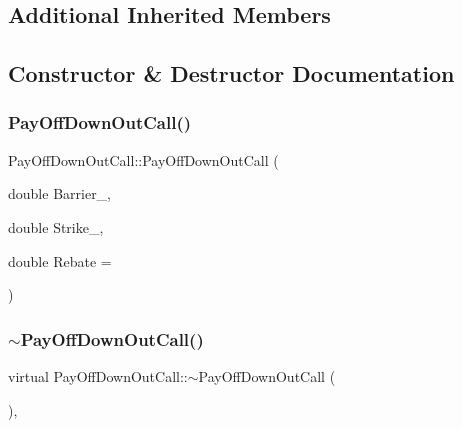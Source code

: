 \subsection*{Additional Inherited Members}


\subsection{Constructor \& Destructor Documentation}
\hypertarget{classPayOffDownOutCall_a2fd200f24f2c56766f5193f3c10a0d61}{}\label{classPayOffDownOutCall_a2fd200f24f2c56766f5193f3c10a0d61} 
\subsubsection{\texorpdfstring{Pay\+Off\+Down\+Out\+Call()}{PayOffDownOutCall()}}
{\footnotesize\ttfamily Pay\+Off\+Down\+Out\+Call\+::\+Pay\+Off\+Down\+Out\+Call (\begin{DoxyParamCaption}\item[{double}]{Barrier\+\_\+,  }\item[{double}]{Strike\+\_\+,  }\item[{double}]{Rebate = {} }\end{DoxyParamCaption})}

\hypertarget{classPayOffDownOutCall_ab2fcb3cf46971007e31d46b6478a52c1}{}\label{classPayOffDownOutCall_ab2fcb3cf46971007e31d46b6478a52c1} 
\subsubsection{\texorpdfstring{$\sim$\+Pay\+Off\+Down\+Out\+Call()}{~PayOffDownOutCall()}}
{\footnotesize\ttfamily virtual Pay\+Off\+Down\+Out\+Call\+::$\sim$\+Pay\+Off\+Down\+Out\+Call (\begin{DoxyParamCaption}{ }\end{DoxyParamCaption})\hspace{0.3cm}{\ttfamily [inline]}, {\ttfamily [virtual]}}



